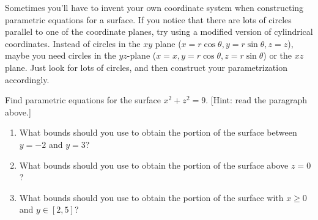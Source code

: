 Sometimes you'll have to invent your own coordinate system when constructing parametric equations for a surface.  If you notice that there are lots of circles parallel to one of the coordinate planes, try using a modified version of cylindrical coordinates. Instead of circles in the $xy$ plane ($x=r\cos\theta,y=r\sin\theta,z=z$), maybe you need circles in the $yz$-plane ($x=x,y=r\cos\theta,z=r\sin\theta$) or the $xz$ plane.  Just look for lots of circles, and then construct your parametrization accordingly.
\begin{problem}
%
Find parametric equations for the surface $x^2+z^2=9$. [Hint: read the paragraph above.]  
\begin{enumerate}
 \item{}%
 What bounds should you use to obtain the portion of the surface between $y=-2$ and $y=3$?
 \item What bounds should you use to obtain the portion of the surface above $z=0$?
 \item What bounds should you use to obtain the portion of the surface with $x\geq 0$ and $y\in[2,5]$?
\end{enumerate}
\end{problem}



